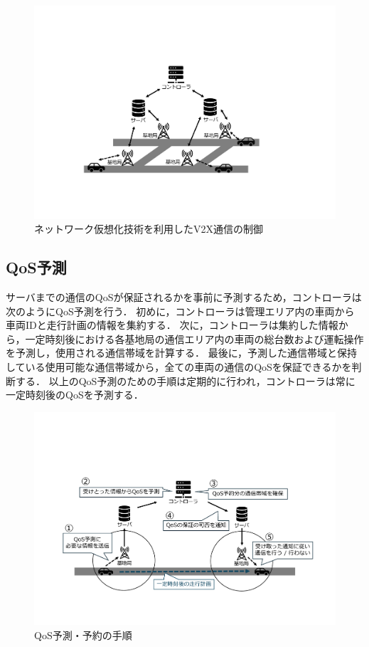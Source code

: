 \documentclass[a4paper,10pt,twocolumn,uplatex]{jsarticle}
\begin{document}
\begin{figure}[t]
	\begin{centering}
    \includegraphics[width=\linewidth]{img/NW_Resume.pdf}
    \caption{ネットワーク仮想化技術を利用したV2X通信の制御}
    \label{fig:NV}
    \end{centering}
\end{figure}

\subsection{QoS予測}
\label{QoSPrediction}
サーバまでの通信のQoSが保証されるかを事前に予測するため，コントローラは次のようにQoS予測を行う．
初めに，コントローラは管理エリア内の車両から車両IDと走行計画の情報を集約する．
次に，コントローラは集約した情報から，一定時刻後における各基地局の通信エリア内の車両の総台数および運転操作を予測し，使用される通信帯域を計算する．
最後に，予測した通信帯域と保持している使用可能な通信帯域から，全ての車両の通信のQoSを保証できるかを判断する．
以上のQoS予測のための手順は定期的に行われ，コントローラは常に一定時刻後のQoSを予測する．

\begin{figure}[t]
	\begin{centering}
    \includegraphics[width=0.90\linewidth]{img/Proposal_Resume.pdf}
    \caption{QoS予測・予約の手順}
    \label{fig:QoSP&R}
    \end{centering}
\end{figure}
\end{document}
